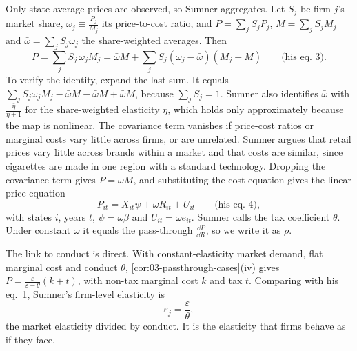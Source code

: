 Only state-average prices are observed, so Sumner aggregates. Let $S_j$ be firm $j$'s market share, $\omega_j \equiv
\frac{P_j}{M_j}$ its price-to-cost ratio, and $P = \sum_j S_j P_j$, $M = \sum_j S_j M_j$ and
$\bar\omega = \sum_j S_j\omega_j$ the share-weighted averages. Then
\begin{equation*}
P = \sum_j S_j\,\omega_j M_j = \bar\omega M + \sum_j S_j(\omega_j - \bar\omega)(M_j - M) \qquad \text{(his eq.~3)}.
\end{equation*}
To verify the identity, expand the last sum. It equals $\sum_j S_j\omega_j M_j - \bar\omega M - \bar\omega M +
\bar\omega M$, because $\sum_j S_j = 1$. Sumner also identifies $\bar\omega$ with $\frac{\bar\eta}{\bar\eta + 1}$ for
the share-weighted elasticity $\bar\eta$, which holds only approximately because the map is nonlinear. The covariance
term vanishes if price-cost ratios or marginal costs vary little across firms, or are unrelated. Sumner argues that
retail prices vary little across brands within a market and that costs are similar, since cigarettes are made in one
region with a standard technology. Dropping the covariance term gives $P = \bar\omega M$, and substituting the cost
equation gives the linear price equation
\begin{equation*}
P_{it} = X_{it}\psi + \bar\omega R_{it} + U_{it} \qquad \text{(his eq.~4)},
\end{equation*}
with states $i$, years $t$, $\psi = \bar\omega\beta$ and $U_{it} = \bar\omega e_{it}$. Sumner calls the tax coefficient
$\theta$. Under constant $\bar\omega$ it equals the pass-through $\frac{\dd P}{\dd R}$, so we write it as $\rho$.

The link to conduct is direct. With constant-elasticity market demand, flat marginal cost and conduct $\theta$,
\cref{cor:03-passthrough-cases}(iv) gives $P = \frac{\varepsilon}{\varepsilon - \theta}(k + t)$, with non-tax marginal
cost $k$ and tax $t$. Comparing with his eq.~1, Sumner's firm-level elasticity is
\begin{equation*}
\varepsilon_j = \frac{\varepsilon}{\theta},
\end{equation*}
the market elasticity divided by conduct. It is the elasticity that firms behave as if they face.

